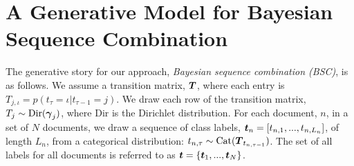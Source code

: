 \section{A Generative Model for Bayesian Sequence Combination}\label{sec:model}
The generative story for our approach, \emph{Bayesian sequence combination (BSC)}, is as follows.
We assume a transition matrix, $\boldsymbol T$, where each entry is $T_{j,\iota} = p(t_{\tau} = \iota | t_{\tau-1} = j)$.
We draw each row of the transition matrix, $T_j \sim \mathrm{Dir}(\boldsymbol \gamma_j)$, where $\mathrm{Dir}$ is the Dirichlet distribution. 
For each document, $n$, in a set of $N$ documents, we draw a sequence of class labels, 
$\boldsymbol t_n = [t_{n,1}, ..., t_{n, L_n}]$, of length $L_n$, from a categorical distribution:
$t_{n,\tau} \sim \mathrm{Cat}(\boldsymbol T_{t_{n,\tau-1}})$. The set of all labels for all documents is referred to as $\boldsymbol t = \{\boldsymbol t_1,...,\boldsymbol t_N\}$.

